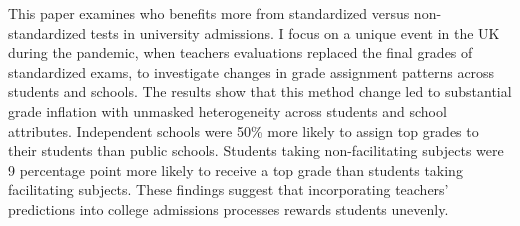 This paper examines who benefits more from standardized versus non-standardized tests in university admissions. I focus on a unique event in the UK during the pandemic, when teachers evaluations replaced the final grades of standardized exams, to investigate changes in grade assignment patterns across students and schools. The results show that this method change led to substantial grade inflation with unmasked heterogeneity across students and school attributes. Independent schools were 50\% more likely to assign top grades to their students than public schools. Students taking non-facilitating subjects were 9 percentage point more likely to receive a top grade than students taking facilitating subjects. These findings suggest that incorporating teachers' predictions into college admissions processes rewards students unevenly.